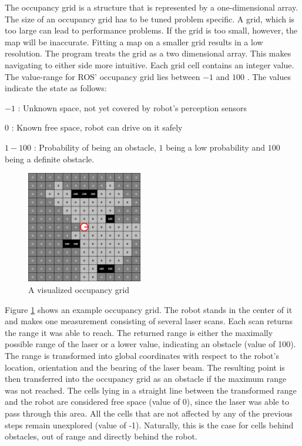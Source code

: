 \documentclass{ba-kecs}
\begin{document}
The occupancy grid is a structure that is represented by a one-dimensional array. The size of an occupancy grid has to be tuned problem specific. A grid, which is too large can lead to performance problems. If the grid is too small, however, the map will be inaccurate. Fitting a map on a smaller grid results in a low resolution.
The program treats the grid as a two dimensional array. This makes navigating to either side more intuitive. Each grid cell contains an integer value. The value-range for ROS' occupancy grid lies between $-1$ and $100$ \cite{occupancy}. The values indicate the state as follows:
\begin{description}
\item{$-1$} : Unknown space, not yet covered by robot's perception sensors
\item{$0$} : Known free space, robot can drive on it safely
\item{$1-100$} : Probability of being an obstacle, $1$ being a low probability and $100$ being a definite obstacle.
\end{description}
\begin{figure}[htbp]
	\centering
		\includegraphics[width=0.45\textwidth]{figures/Occup.png}
	\caption{A visualized occupancy grid}
	\label{fig:Occupancy}
\end{figure}
Figure \ref{fig:Occupancy} shows an example occupancy grid. The robot stands in the center of it and makes one measurement consisting of several laser scans. Each scan returns the range it was able to reach. The returned range is either the maximally possible range of the laser or a lower value, indicating an obstacle (value of 100). The range is transformed into global coordinates with respect to the robot's location, orientation and the bearing of the laser beam. The resulting point is then transferred into the occupancy grid as an obstacle if the maximum range was not reached. The cells lying in a straight line between the transformed range and the robot are considered free space (value of 0), since the laser was able to pass through this area. All the cells that are not affected by any of the previous steps remain unexplored (value of -1). Naturally, this is the case for cells behind obstacles, out of range and directly behind the robot.
\end{document}
